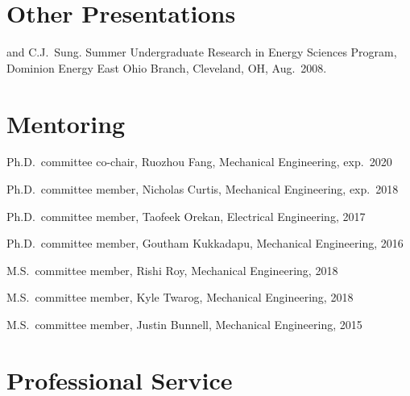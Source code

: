 \section{{\sectionfont Other Presentations}}

\begin{bibmune}
\item {} and C.J.\ Sung.  Summer Undergraduate Research in Energy Sciences Program,
        Dominion Energy East Ohio Branch, Cleveland, OH, Aug.\ 2008.\\
\end{bibmune}

\vspace{\baselineskip}

\section{\sectionfont{} Mentoring}

\begin{lonelist}
\item Ph.D.\ committee co-chair, Ruozhou Fang, Mechanical Engineering, exp.\ 2020
\item Ph.D.\ committee member, Nicholas Curtis, Mechanical Engineering, exp.\ 2018
\item Ph.D.\ committee member, Taofeek Orekan, Electrical Engineering, 2017
\item Ph.D.\ committee member, Goutham Kukkadapu, Mechanical Engineering, 2016
\item M.S.\ committee member, Rishi Roy, Mechanical Engineering, 2018
\item M.S.\ committee member, Kyle Twarog, Mechanical Engineering, 2018
\item M.S.\ committee member, Justin Bunnell, Mechanical Engineering, 2015
\end{lonelist}

\vspace{\baselineskip}

\section{{\sectionfont Professional Service}}

